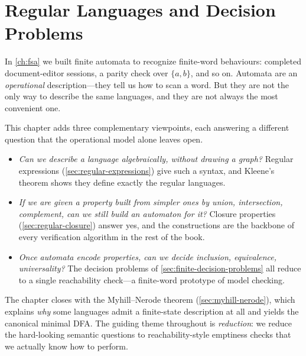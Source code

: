 
\chapter{Regular Languages and Decision Problems}
\label{ch:regular-decision}


In \cref{ch:fsa} we built finite automata to recognize finite-word
behaviours: completed document-editor sessions, a parity check over
$\{a,b\}$, and so on.  Automata are an \emph{operational}
description---they tell us how to scan a word.  But they are not the
only way to describe the same languages, and they are not always the
most convenient one.

This chapter adds three complementary viewpoints, each answering a
different question that the operational model alone leaves open.
\begin{itemize}[nosep]
  \item \emph{Can we describe a language algebraically, without drawing
  a graph?}  Regular expressions (\cref{sec:regular-expressions}) give
  such a syntax, and Kleene's theorem shows they define exactly the
  regular languages.
  \item \emph{If we are given a property built from simpler ones by
  union, intersection, complement, can we still build an automaton for
  it?}  Closure properties (\cref{sec:regular-closure}) answer yes, and
  the constructions are the backbone of every verification algorithm
  in the rest of the book.
  \item \emph{Once automata encode properties, can we decide inclusion,
  equivalence, universality?}  The decision problems of
  \cref{sec:finite-decision-problems} all reduce to a single
  reachability check---a finite-word prototype of model checking.
\end{itemize}
The chapter closes with the Myhill--Nerode theorem
(\cref{sec:myhill-nerode}), which explains \emph{why} some languages
admit a finite-state description at all and yields the canonical minimal
DFA.  The guiding theme throughout is \emph{reduction}: we reduce the
hard-looking semantic questions to reachability-style emptiness checks
that we actually know how to perform.


